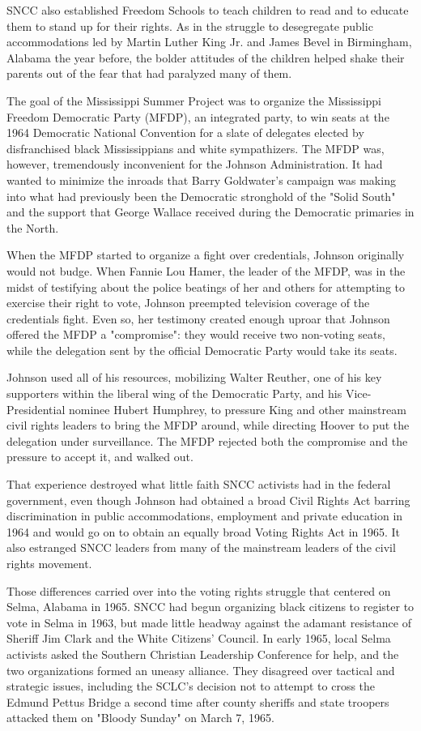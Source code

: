 SNCC also established Freedom Schools to teach children to read and to
educate them to stand up for their rights. As in the struggle to
desegregate public accommodations led by Martin Luther King Jr. and
James Bevel in Birmingham, Alabama the year before, the bolder attitudes
of the children helped shake their parents out of the fear that had
paralyzed many of them.

The goal of the Mississippi Summer Project was to organize the
Mississippi Freedom Democratic Party (MFDP), an integrated party, to win
seats at the 1964 Democratic National Convention for a slate of
delegates elected by disfranchised black Mississippians and white
sympathizers. The MFDP was, however, tremendously inconvenient for the
Johnson Administration. It had wanted to minimize the inroads that Barry
Goldwater's campaign was making into what had previously been the
Democratic stronghold of the "Solid South" and the support that George
Wallace received during the Democratic primaries in the North.

When the MFDP started to organize a fight over credentials, Johnson
originally would not budge. When Fannie Lou Hamer, the leader of the
MFDP, was in the midst of testifying about the police beatings of her
and others for attempting to exercise their right to vote, Johnson
preempted television coverage of the credentials fight. Even so, her
testimony created enough uproar that Johnson offered the MFDP a
"compromise": they would receive two non-voting seats, while the
delegation sent by the official Democratic Party would take its seats.

Johnson used all of his resources, mobilizing Walter Reuther, one of his
key supporters within the liberal wing of the Democratic Party, and his
Vice-Presidential nominee Hubert Humphrey, to pressure King and other
mainstream civil rights leaders to bring the MFDP around, while
directing Hoover to put the delegation under surveillance. The MFDP
rejected both the compromise and the pressure to accept it, and walked
out.

That experience destroyed what little faith SNCC activists had in the
federal government, even though Johnson had obtained a broad Civil
Rights Act barring discrimination in public accommodations, employment
and private education in 1964 and would go on to obtain an equally broad
Voting Rights Act in 1965. It also estranged SNCC leaders from many of
the mainstream leaders of the civil rights movement.

Those differences carried over into the voting rights struggle that
centered on Selma, Alabama in 1965. SNCC had begun organizing black
citizens to register to vote in Selma in 1963, but made little headway
against the adamant resistance of Sheriff Jim Clark and the White
Citizens' Council. In early 1965, local Selma activists asked the
Southern Christian Leadership Conference for help, and the two
organizations formed an uneasy alliance. They disagreed over tactical
and strategic issues, including the SCLC's decision not to attempt to
cross the Edmund Pettus Bridge a second time after county sheriffs and
state troopers attacked them on "Bloody Sunday" on March 7, 1965.

